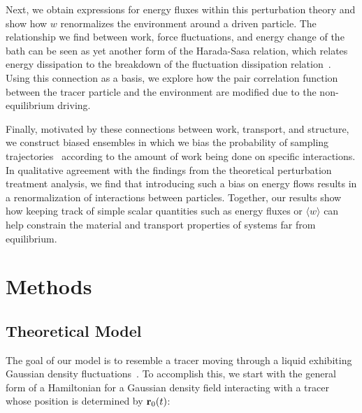 \documentclass[pre,amsmath,preprintnumbers,10pt,article,notitlepage,twocolumn]{revtex4-1}
\begin{document}
Next, we obtain expressions for energy fluxes within this perturbation theory and show how $w$ renormalizes the environment around a driven particle. The relationship we find between work, force fluctuations, and energy change of the bath can be seen as yet another form of the Harada-Sasa relation, which relates energy dissipation to the breakdown of the fluctuation dissipation relation~\cite{Harada2005, Harada2006}. Using this connection as a basis, we explore how the pair correlation function between the tracer particle and the environment are modified due to the non-equilibrium driving. 

Finally, motivated by these connections between work, transport, and structure, we construct biased ensembles in which we bias the probability of sampling trajectories~\cite{Chetrite2013,Jack2010} according to the amount of work being done on specific interactions. In qualitative agreement with the findings from the theoretical perturbation treatment analysis, we find that introducing such a bias on energy flows results in a renormalization of interactions between particles. Together, our results show how keeping track of simple scalar quantities such as energy fluxes or $\langle w\rangle$ can help constrain the material and transport properties of systems far from equilibrium. 



\section{Methods}

\subsection{Theoretical Model}

The goal of our model is to resemble a tracer moving through a liquid exhibiting Gaussian density fluctuations~\cite{Chandler1993}. To accomplish this, we start with the general form of a Hamiltonian for a Gaussian density field interacting with a tracer whose position is determined by ${\bf r}_0(t)$:
\end{document}
